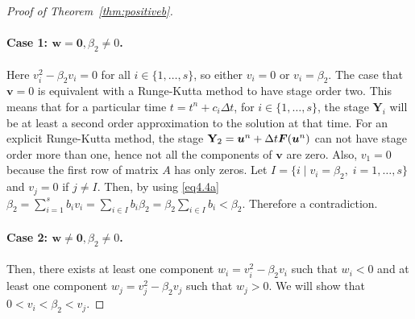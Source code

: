 \begin{proof}[Proof of Theorem~\ref{thm:positiveb}]
\paragraph{Case 1: \( \bm{w} = \bm{0}, \beta_2 \neq 0 \).}

Here \( v_{i}^{2} - \beta_{2}v_{i} = 0 \) for all \( i \in \{1,\dots,s\} \), so either \( v_{i} = 0 \) or \( v_{i} = \beta_{2} \).
The case that \( \bm{v} = 0 \) is equivalent with a Runge-Kutta method to have stage order two. This means that for a particular time \( t = t^{n} + c_{i}\Delta t \), for \( i \in \{1, \dots, s\} \), the stage \( \textbf{Y}_{i} \) will be at least a second order approximation to the solution at that time.
For an explicit Runge-Kutta method, the stage \( \textbf{Y}_{2} = \bm{u}^{n} + \Delta t\bm{F}(\bm{u}^{n}) \) can not have stage order more than one, hence not all the components of \( \bm{v} \) are zero. Also, \( v_{1} = 0 \) because the first row of matrix \( A \) has only zeros. Let \( I = \{ i \;|\; v_{i} = \beta_{2}, \; i = 1,\dots,s \} \) and \( v_{j} = 0 \) if \( j \neq I \). Then, by using \eqref{eq4.4a} \( \beta_{2} = \sum_{i=1}^{s}b_{i}v_{i} = \sum_{i \in I}b_{i}\beta_{2} = \beta_{2}\sum_{i \in I}b_{i} < \beta_{2} \). Therefore a contradiction.


\paragraph{Case 2: \( \bm{w} \neq \bm{0}, \beta_2 \neq 0 \).}

    Then, there exists at least one component \( w_{i} = v_{i}^{2} - \beta_{2}v_{i} \) such that \( w_{i} < 0 \) and at least one component \( w_{j} = v_{j}^{2} - \beta_{2}v_{j} \) such that \( w_{j} > 0 \). We will show that \( 0 < v_{i} < \beta_{2} < v_{j} \).


\end{proof}
